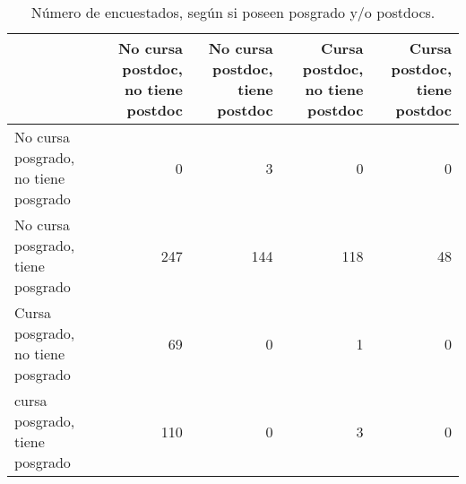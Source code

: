 \begin{table}[ht]
\centering
\begin{tabular}{|p{3cm}|r|r|r|r|}
  \hline
 & No cursa postdoc, no tiene postdoc & No cursa postdoc, tiene postdoc & Cursa postdoc, no tiene postdoc & Cursa postdoc, tiene postdoc \\ 
  \hline
No cursa posgrado, no tiene posgrado & 0 & 3 & 0 & 0 \\ 
  No cursa posgrado, tiene posgrado & 247 & 144 & 118 & 48 \\ 
  Cursa posgrado, no tiene posgrado & 69 & 0 & 1 & 0 \\ 
  cursa posgrado, tiene posgrado & 110 & 0 & 3 & 0 \\ 
   \hline
\end{tabular}
\caption{Número de encuestados, según si poseen posgrado y/o postdocs.} 
\label{tab:count}
\end{table}
